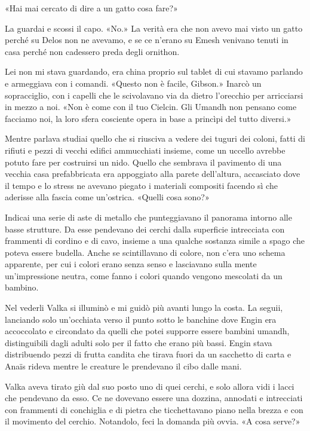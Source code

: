 «Hai mai cercato di dire a un gatto cosa fare?»

La guardai e scossi il capo. «No.» La verità era che non avevo mai visto
un gatto perché su Delos non ne avevamo, e se ce n'erano su Emesh
venivano tenuti in casa perché non cadessero preda degli ornithon.

Lei non mi stava guardando, era china proprio sul tablet di cui stavamo
parlando e armeggiava con i comandi. «Questo non è facile, Gibson.»
Inarcò un sopracciglio, con i capelli che le {scivolavano} via da dietro
l'orecchio per arricciarsi in mezzo a noi. «Non è come con il tuo
Cielcin. Gli Umandh non pensano come facciamo noi, la loro sfera
cosciente opera in base a princìpi del tutto diversi.»

Mentre parlava studiai quello che si riusciva a vedere dei tuguri dei
coloni, fatti di rifiuti e pezzi di vecchi edifici ammucchiati insieme,
come un uccello avrebbe potuto fare per costruirsi un nido. Quello che
sembrava il pavimento di una vecchia casa prefabbricata era appoggiato
alla parete dell'altura, accasciato dove il tempo e lo stress ne avevano
piegato i materiali compositi facendo sì che aderisse alla fascia come
un'ostrica. «Quelli cosa sono?»

Indicai una serie di aste di metallo che punteggiavano il panorama
intorno alle basse strutture. Da esse pendevano dei cerchi dalla
superficie intrecciata con frammenti di cordino e di cavo, insieme a una
qualche sostanza simile a spago che poteva essere budella. Anche se
scintillavano di colore, non c'era uno schema apparente, per cui i
colori erano senza senso e lasciavano sulla mente un'impressione neutra,
come fanno i colori quando vengono mescolati da un bambino.

Nel vederli Valka si illuminò e mi guidò più avanti lungo la costa. La
seguii, lanciando solo un'occhiata verso il punto sotto le banchine dove
Engin era accoccolato e circondato da quelli che potei supporre essere
bambini umandh, distinguibili dagli adulti solo per il fatto che erano
più bassi. Engin stava distribuendo pezzi di frutta candita che tirava
fuori da un sacchetto di carta e Anaïs rideva mentre le creature le
prendevano il cibo dalle mani.

Valka aveva tirato giù dal suo posto uno di quei cerchi, e solo allora
vidi i lacci che pendevano da esso. Ce ne dovevano essere una dozzina,
annodati e intrecciati con frammenti di conchiglia e di pietra che
ticchettavano piano nella brezza e con il movimento del cerchio.
Notandolo, feci la domanda più ovvia. «A cosa serve?»

